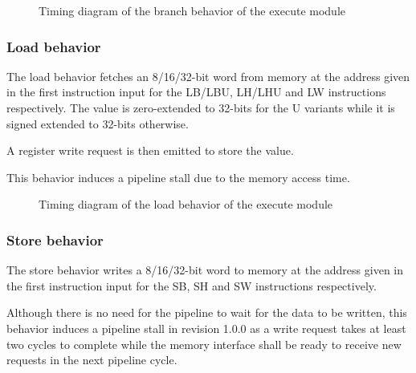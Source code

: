       \begin{figure}[H]
          \centering
          
          \caption{Timing diagram of the branch behavior of the execute module}
          \label{fig:exm-behavior-branch}
        \end{figure}

      

    \subsubsection{Load behavior}

      \begin{content}
          The load behavior fetches an 8/16/32-bit word from memory at the address given in the first instruction input for the LB/LBU, LH/LHU and LW instructions respectively. The value is zero-extended to 32-bits for the U variants while it is signed extended to 32-bits otherwise. 
          
          A register write request is then emitted to store the value. 
          
          This behavior induces a pipeline stall due to the memory access time.
        \end{content}

      \begin{figure}[H]
          \centering
          
          \caption{Timing diagram of the load behavior of the execute module}
          \label{fig:exm-behavior-load}
        \end{figure}

      

    \subsubsection{Store behavior}

      \begin{content}
          The store behavior writes a 8/16/32-bit word to memory at the address given in the first instruction input for the SB, SH and SW instructions respectively.

          Although there is no need for the pipeline to wait for the data to be written, this behavior induces a pipeline stall in revision 1.0.0 as a write request takes at least two cycles to complete while the memory interface shall be ready to receive new requests in the next pipeline cycle.
        \end{content}

